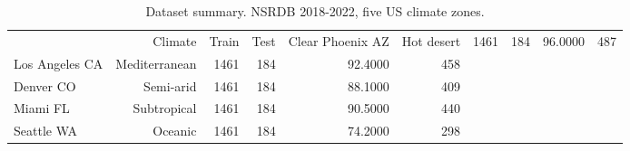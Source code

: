 \begin{table}[ht]
\centering
\caption{Dataset summary. NSRDB 2018-2022, five US climate zones.}
\label{tab:dataset}
\begin{tabular}{lrrrrr}
\toprule
 & Climate & Train & Test & Clear %
\midrule
Phoenix AZ & Hot desert & 1461 & 184 & 96.0000 & 487 \\
Los Angeles CA & Mediterranean & 1461 & 184 & 92.4000 & 458 \\
Denver CO & Semi-arid & 1461 & 184 & 88.1000 & 409 \\
Miami FL & Subtropical & 1461 & 184 & 90.5000 & 440 \\
Seattle WA & Oceanic & 1461 & 184 & 74.2000 & 298 \\
\bottomrule
\end{tabular}
\end{table}